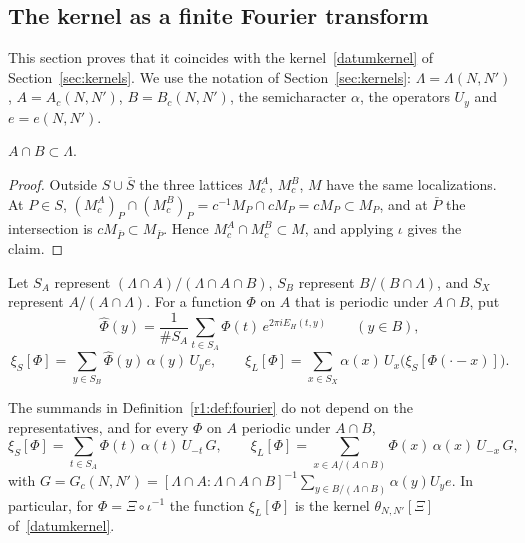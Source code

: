 \subsection{The kernel as a finite Fourier transform}\label{r1:sec:R1fourier}

This section proves that it coincides with the kernel~\eqref{datumkernel} of Section~\ref{sec:kernels}. We use the notation of Section~\ref{sec:kernels}: $\Lambda=\Lambda(N,N')$, $A=A_c(N,N')$, $B=B_c(N,N')$, the semicharacter $\alpha$, the operators $U_y$ and $e=e(N,N')$.

\begin{lemma}\label{r1:lem:ABinLambda}
$A\cap B\subset\Lambda$.
\end{lemma}

\begin{proof}
Outside $S\cup\bar S$ the three lattices $M^A_c$, $M^B_c$, $M$ have the same localizations. At $P\in S$, $(M^A_c)_P\cap(M^B_c)_P=c^{-1}M_P\cap cM_P=cM_P\subset M_P$, and at $\bar P$ the intersection is $cM_{\bar P}\subset M_{\bar P}$. Hence $M^A_c\cap M^B_c\subset M$, and applying $\iota$ gives the claim.
\end{proof}

\begin{definition}\label{r1:def:fourier}
Let $S_A$ represent $(\Lambda\cap A)/(\Lambda\cap A\cap B)$, $S_B$ represent $B/(B\cap\Lambda)$, and $S_X$ represent $A/(A\cap\Lambda)$. For a function $\Phi$ on $A$ that is periodic under $A\cap B$, put
\[
\widehat\Phi(y)=\frac1{\#S_A}\sum_{t\in S_A}\Phi(t)\,e^{2\pi iE_H(t,y)}\qquad(y\in B),
\]
\[
\xi_S[\Phi]=\sum_{y\in S_B}\widehat\Phi(y)\,\alpha(y)\,U_ye,\qquad\xi_L[\Phi]=\sum_{x\in S_X}\alpha(x)\,U_x\big(\xi_S[\Phi(\cdot-x)]\big).
\]
\end{definition}

\begin{proposition}\label{r1:prop:fourier}
The summands in Definition~\ref{r1:def:fourier} do not depend on the representatives, and for every $\Phi$ on $A$ periodic under $A\cap B$,
\[
\xi_S[\Phi]=\sum_{t\in S_A}\Phi(t)\,\alpha(t)\,U_{-t}\,G,\qquad
\xi_L[\Phi]=\sum_{x\in A/(A\cap B)}\Phi(x)\,\alpha(x)\,U_{-x}\,G,
\]
with $G=G_c(N,N')=[\Lambda\cap A:\Lambda\cap A\cap B]^{-1}\sum_{y\in B/(\Lambda\cap B)}\alpha(y)U_ye$. In particular, for $\Phi=\Xi\circ\iota^{-1}$ the function $\xi_L[\Phi]$ is the kernel $\theta_{N,N'}[\Xi]$ of~\eqref{datumkernel}.
\end{proposition}

